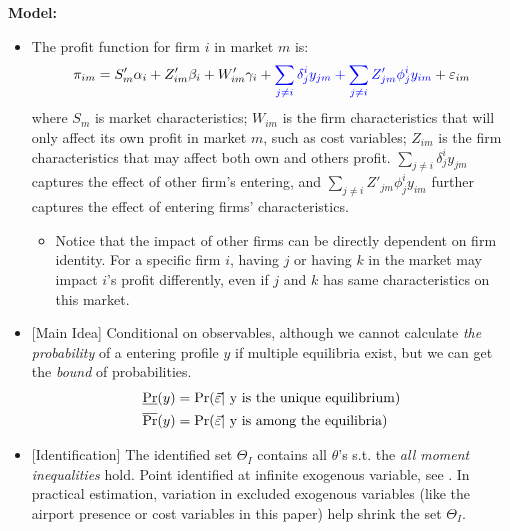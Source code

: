 \documentclass{book}
\theoremstyle{plain}
\theoremstyle{definition}
\begin{document}
\vspace{1em}
\noindent
\textbf{Model:}
\begin{itemize}
	\item The profit function for firm $i$ in market $m$ is:
	\[\pi_{im}=S'_m\alpha_i + Z'_{im}\beta_i+W'_{im}\gamma_i+
	\textcolor{blue}{\sum_{j\neq i }\delta^i_j y_{jm}+\sum_{j\neq i}Z'_{jm}\phi^i_j y_{im}}
	+\varepsilon_{im}\]
	where $S_m$ is market characteristics; $W_{im}$ is the firm characteristics that will only affect its own profit in market $m$, such as cost variables; $Z_{im}$ is the firm characteristics that may affect both own and others profit.
	$\sum_{j\neq i }\delta^i_j y_{jm}$ captures the effect of other firm's entering, and $\sum_{j\neq i}Z'_{jm}\phi^i_j y_{im}$ further captures the effect of entering firms' characteristics.
	\begin{itemize}
		\item Notice that the impact of other firms can be directly dependent on firm identity.
		For a specific firm $i$, having $j$ or having $k$ in the market may impact $i$'s profit differently, even if $j$ and $k$ has same characteristics on this market.
	\end{itemize}
	
	\item {[Main Idea]} Conditional on observables, although we cannot calculate \textit{the probability} of a entering profile $y$ if multiple equilibria exist, but we can get the \textit{bound} of probabilities.
	\begin{align}
		& \underline \Pr(y) = \Pr(\vec \varepsilon | \text{ y is the unique equilibrium}) \notag \\
	& \overline \Pr(y) = \Pr(\vec \varepsilon | \text{ y is among the equilibria})
	\end{align}

	\item {[Identification]} The identified set $\Theta_I$ contains all $\theta$'s s.t. the \textit{all moment inequalities} hold. 
	Point identified at infinite exogenous variable, see \cite{Tamer:2003hi}.
	In practical estimation, variation in excluded exogenous variables (like the airport presence or cost variables in this paper) help shrink the set $\Theta_I$.
\end{itemize}
\end{document}
